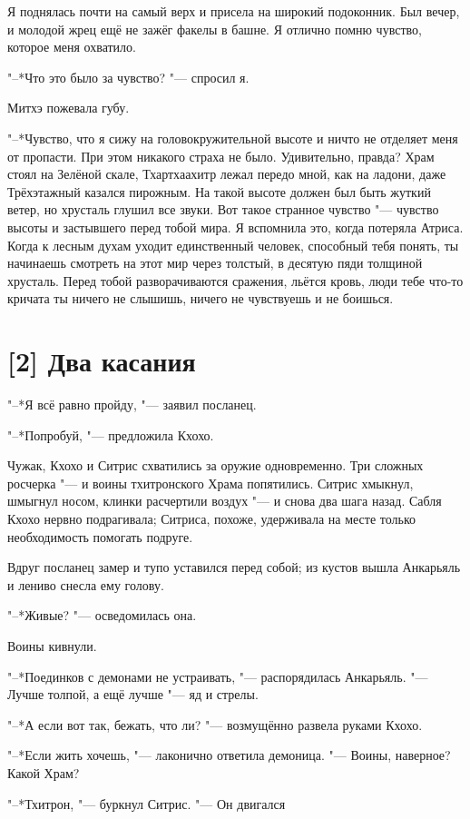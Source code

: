 Я поднялась почти на самый верх и присела на широкий подоконник.
Был вечер, и молодой жрец ещё не зажёг факелы в башне.
Я отлично помню чувство, которое меня охватило.

"--*Что это было за чувство? "--- спросил я.

Митхэ пожевала губу.

"--*Чувство, что я сижу на головокружительной высоте и ничто не отделяет меня от пропасти.
При этом никакого страха не было.
Удивительно, правда?
Храм стоял на Зелёной скале, Тхартхаахитр лежал передо мной, как на ладони, даже Трёхэтажный казался пирожным.
На такой высоте должен был быть жуткий ветер, но хрусталь глушил все звуки.
Вот такое странное чувство "--- чувство высоты и застывшего перед тобой мира.
Я вспомнила это, когда потеряла Атриса.
Когда к лесным духам уходит единственный человек, способный тебя понять, ты начинаешь смотреть на этот мир через толстый, в десятую пяди толщиной хрусталь.
Перед тобой разворачиваются сражения, льётся кровь, люди тебе что-то кричат\ldotst а ты ничего не слышишь, ничего не чувствуешь и не боишься.

\section{[2] Два касания}

"--*Я всё равно пройду, "--- заявил посланец.

"--*Попробуй, "--- предложила Кхохо.

Чужак, Кхохо и Ситрис схватились за оружие одновременно.
Три сложных росчерка "--- и воины тхитронского Храма попятились.
Ситрис хмыкнул, шмыгнул носом, клинки расчертили воздух "--- и снова два шага назад.
Сабля Кхохо нервно подрагивала;
Ситриса, похоже, удерживала на месте только необходимость помогать подруге.

Вдруг посланец замер и тупо уставился перед собой;
из кустов вышла Анкарьяль и лениво снесла ему голову.

"--*Живые? "--- осведомилась она.

Воины кивнули.

"--*Поединков с демонами не устраивать, "--- распорядилась Анкарьяль.
"--- Лучше толпой, а ещё лучше "--- яд и стрелы.

"--*А если вот так, бежать, что ли? "--- возмущённо развела руками Кхохо.

"--*Если жить хочешь, "--- лаконично ответила демоница.
"--- Воины, наверное?
Какой Храм?

"--*Тхитрон, "--- буркнул Ситрис.
"--- Он двигался\ldotst

